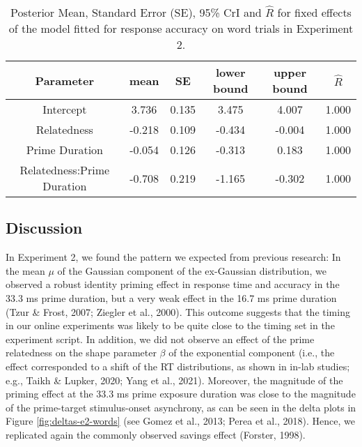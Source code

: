 \documentclass[
  english,
  man,floatsintext]{apa6}
\begin{document}
\begin{table}[H]

\begin{center}
\begin{threeparttable}

\caption{\label{tab:exp2-acc-blmm-table}Posterior Mean, Standard Error (SE), 95\% CrI and \(\hat{R}\) for fixed effects of the model fitted for response accuracy on word trials in Experiment 2.}

\small{

\begin{tabular}{cccccc}
\toprule
Parameter & \multicolumn{1}{c}{mean} & \multicolumn{1}{c}{SE} & \multicolumn{1}{c}{lower bound} & \multicolumn{1}{c}{upper bound} & \multicolumn{1}{c}{$\hat{R}$}\\
\midrule
Intercept & 3.736 & 0.135 & 3.475 & 4.007 & 1.000\\
Relatedness & -0.218 & 0.109 & -0.434 & -0.004 & 1.000\\
Prime Duration & -0.054 & 0.126 & -0.313 & 0.183 & 1.000\\
Relatedness:Prime Duration & -0.708 & 0.219 & -1.165 & -0.302 & 1.000\\
\bottomrule
\end{tabular}

}

\end{threeparttable}
\end{center}

\end{table}

\hypertarget{discussion-1}{%
\subsection{Discussion}\label{discussion-1}}

In Experiment 2, we found the pattern we expected from previous research: In the mean \(\mu\) of the Gaussian component of the ex-Gaussian distribution, we observed a robust identity priming effect in response time and accuracy in the 33.3 ms prime duration, but a very weak effect in the 16.7 ms prime duration (Tzur \& Frost, 2007; Ziegler et al., 2000). This outcome suggests that the timing in our online experiments was likely to be quite close to the timing set in the experiment script. In addition, we did not observe an effect of the prime relatedness on the shape parameter \(\beta\) of the exponential component (i.e., the effect corresponded to a shift of the RT distributions, as shown in in-lab studies; e.g., Taikh \& Lupker, 2020; Yang et al., 2021). Moreover, the magnitude of the priming effect at the 33.3 ms prime exposure duration was close to the magnitude of the prime-target stimulus-onset asynchrony, as can be seen in the delta plots in Figure \ref{fig:deltas-e2-words} (see Gomez et al., 2013; Perea et al., 2018). Hence, we replicated again the commonly observed savings effect (Forster, 1998).
\end{document}
